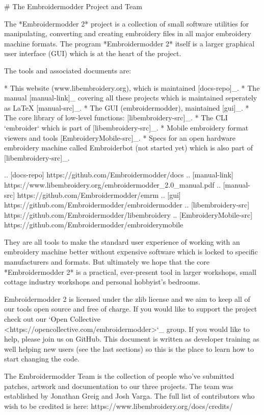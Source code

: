 # The Embroidermodder Project and Team

The *Embroidermodder 2* project is a collection of small software utilities for
manipulating, converting and creating embroidery files in all major embroidery
machine formats. The program *Embroidermodder 2* itself is a larger graphical
user interface (GUI) which is at the heart of the project.

The tools and associated documents are:

* This website (www.libembroidery.org), which is maintained [docs-repo]_.
* The manual [manual-link]_ covering all these projects which is maintained seperately as LaTeX [manual-src]_.
* The GUI (embroidermodder), maintained [gui]_.
* The core library of low-level functions: [libembroidery-src]_.
* The CLI `embroider` which is part of [libembroidery-src]_.
* Mobile embroidery format viewers and tools [EmbroideryMobile-src]_.
* Specs for an open hardware embroidery machine called Embroiderbot (not started yet) which is also part of [libembroidery-src]_.

.. [docs-repo] https://github.com/Embroidermodder/docs
.. [manual-link] https://www.libembroidery.org/embroidermodder_2.0_manual.pdf
.. [manual-src] https://github.com/Embroidermodder/emrm
.. [gui] https://github.com/Embroidermodder/embroidermodder
.. [libembroidery-src] https://github.com/Embroidermodder/libembroidery
.. [EmbroideryMobile-src] https://github.com/Embroidermodder/embroiderymobile

They are all tools to make the standard user experience of working with an
embroidery machine better without expensive software which is locked to specific
manufacturers and formats. But ultimately we hope that the core *Embroidermodder 2*
is a practical, ever-present tool in larger workshops, small cottage industry workshops
and personal hobbyist's bedrooms.

Embroidermodder 2 is licensed under the zlib license and we aim to keep all of
our tools open source and free of charge. If you would like to support the
project check out our `Open Collective <https://opencollective.com/embroidermodder>`_
group. If you would like to help, please
join us on GitHub. This document is written as developer training as well
helping new users (see the last sections) so this is the place to learn how
to start changing the code.

The Embroidermodder Team is the collection of people who've submitted
patches, artwork and documentation to our three projects.
The team was established by Jonathan Greig and Josh Varga.
The full list of contributors who wish to be credited is
here: https://www.libembroidery.org/docs/credits/

